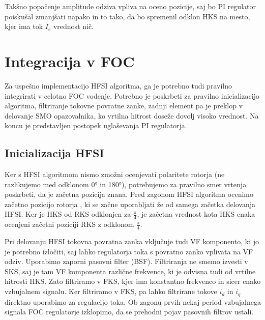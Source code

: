 \documentclass[a4paper,twoside,openright,12pt,slovene]{book}
\begin{document}
Takšno popačenje amplitude odziva vpliva na oceno pozicije, saj bo PI regulator poiskušal zmanjšati napako in to tako, da bo spremenil odklon HKS na mesto, kjer ima tok $I_e$ vrednost nič.

\chapter{Integracija v FOC} \label{integracija}

Za uspešno implementacijo HFSI algoritma, ga je potrebno tudi pravilno integrirati v celotno FOC vodenje. Potrebno je poskrbeti za pravilno inicializacijo algoritma, filtriranje tokovne povratne
zanke, zadnji element pa je preklop v delovanje SMO opazovalnika, ko vrtilna hitrost doseže dovolj visoko vrednost. Na koncu je predstavljen postopek uglaševanja PI regulatorja.

\section{Inicializacija HFSI}

Ker s HFSI algoritmom nismo zmožni ocenjevati polaritete rotorja (ne razlikujemo med odklonom 0° in 180°), potrebujemo za pravilno smer vrtenja poskrbeti, da je začetna pozicija znana. Pred zagonom
HFSI algoritma ocenimo začetno pozicijo rotorja \cite{IPDBoussak}, ki se začne uporabljati že od samega začetka delovanja HFSI. Ker je HKS od RKS odklonjen za $\frac{\pi}{4}$, je začetna vrednost kota
HKS enaka ocenjeni začetni poziciji RKS z odklonom $\frac{\pi}{4}$.

Pri delovanju HFSI tokovna povratna zanka vključuje tudi VF komponento, ki jo je potrebno izločiti, saj lahko regulatorja toka s povratno zanko vplivata na VF odziv. Uporabimo zaporni pasovni
filter (BSF). Filtriranja ne smemo izvesti v SKS, saj je tam VF komponenta različne frekvence, ki je odvisna tudi od vrtilne hitrosti HKS. Zato filtriramo v FKS, kjer ima konstantno frekvenco in sicer
enako vzbujalnem signalu. Ker filtriramo v FKS, pa lahko filtrirane tokove $i_d$ in $i_q$ direktno uporabimo za regulacijo toka. Ob zagonu prvih nekaj period vzbujalnega signala FOC regulatorje
izklopimo, da se prehodni pojav pasovnih filtrov ustali. 
\end{document}
